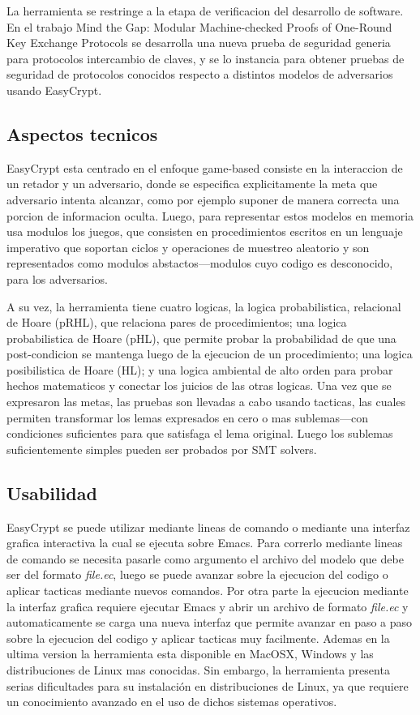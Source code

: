 \documentclass[runningheads]{llncs}
\begin{document}
La herramienta se restringe a la etapa de verificacion del desarrollo de software. En el trabajo Mind the Gap: Modular Machine-checked Proofs of One-Round Key Exchange Protocols\cite{ref_article2} se desarrolla una nueva prueba de seguridad generia para protocolos intercambio de claves, y se lo instancia para obtener pruebas de seguridad de protocolos conocidos respecto a distintos modelos de adversarios usando EasyCrypt.

\subsection{Aspectos tecnicos}

EasyCrypt esta centrado en el enfoque game-based consiste en la interaccion de un retador y un adversario, donde se especifica explicitamente la meta que adversario intenta alcanzar, como por ejemplo suponer de manera correcta una porcion de informacion oculta. Luego, para representar estos modelos en memoria usa modulos los juegos, que consisten en procedimientos escritos en un lenguaje imperativo que soportan ciclos y operaciones de muestreo aleatorio y son representados como modulos abstactos—modulos cuyo codigo es desconocido, para los adversarios.

A su vez, la herramienta tiene cuatro logicas, la logica probabilistica, relacional de Hoare (pRHL), que relaciona pares de procedimientos; una logica probabilistica de Hoare (pHL), que permite probar la probabilidad de que una post-condicion se mantenga luego de la ejecucion de un procedimiento; una logica posibilistica de Hoare (HL); y una logica ambiental de alto orden para probar hechos matematicos y conectar los juicios de las otras logicas. Una vez que se expresaron las metas, las pruebas son llevadas a cabo usando tacticas, las cuales permiten transformar los lemas expresados en cero o mas sublemas—con condiciones suficientes para que satisfaga el lema original. Luego los sublemas suficientemente simples pueden ser probados por SMT solvers.

\subsection{Usabilidad}
EasyCrypt se puede utilizar mediante lineas de comando o mediante una interfaz grafica interactiva la cual se ejecuta sobre Emacs\cite{ref_webpage2}. Para correrlo mediante lineas de comando se necesita pasarle como argumento el archivo del modelo que debe ser del formato \textit{file.ec}, luego se puede avanzar sobre la ejecucion del codigo o aplicar tacticas mediante nuevos comandos. Por otra parte la ejecucion mediante la interfaz grafica requiere ejecutar Emacs y abrir un archivo de formato \textit{file.ec} y automaticamente se carga una nueva interfaz que permite avanzar en paso a paso sobre la ejecucion del codigo y aplicar tacticas muy facilmente. Ademas en la ultima version la herramienta esta disponible en MacOSX, Windows y las distribuciones de Linux mas conocidas. Sin embargo, la herramienta presenta serias dificultades para su instalación en distribuciones de Linux, ya que requiere un conocimiento avanzado en el uso de dichos sistemas operativos.
\end{document}
